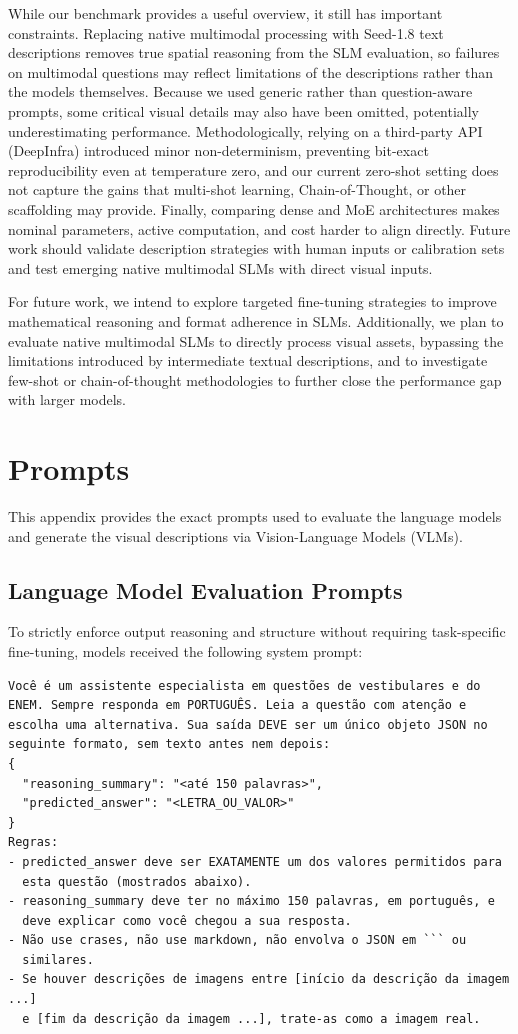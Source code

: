 \documentclass[12pt]{article}
\begin{document}
While our benchmark provides a useful overview, it still has important constraints. Replacing native multimodal processing with Seed-1.8 text descriptions removes true spatial reasoning from the SLM evaluation, so failures on multimodal questions may reflect limitations of the descriptions rather than the models themselves. Because we used generic rather than question-aware prompts, some critical visual details may also have been omitted, potentially underestimating performance. Methodologically, relying on a third-party API (DeepInfra) introduced minor non-determinism, preventing bit-exact reproducibility even at temperature zero, and our current zero-shot setting does not capture the gains that multi-shot learning, Chain-of-Thought, or other scaffolding may provide. Finally, comparing dense and MoE architectures makes nominal parameters, active computation, and cost harder to align directly. Future work should validate description strategies with human inputs or calibration sets and test emerging native multimodal SLMs with direct visual inputs.

For future work, we intend to explore targeted fine-tuning strategies to improve mathematical reasoning and format adherence in SLMs. Additionally, we plan to evaluate native multimodal SLMs to directly process visual assets, bypassing the limitations introduced by intermediate textual descriptions, and to investigate few-shot or chain-of-thought methodologies to further close the performance gap with larger models.

\appendix
\section{Prompts}
\label{sec:prompts}

This appendix provides the exact prompts used to evaluate the language models and generate the visual descriptions via Vision-Language Models (VLMs).

\subsection*{Language Model Evaluation Prompts}
To strictly enforce output reasoning and structure without requiring task-specific fine-tuning, models received the following system prompt:

\begin{verbatim}
Você é um assistente especialista em questões de vestibulares e do 
ENEM. Sempre responda em PORTUGUÊS. Leia a questão com atenção e 
escolha uma alternativa. Sua saída DEVE ser um único objeto JSON no 
seguinte formato, sem texto antes nem depois:
{
  "reasoning_summary": "<até 150 palavras>",
  "predicted_answer": "<LETRA_OU_VALOR>"
}
Regras:
- predicted_answer deve ser EXATAMENTE um dos valores permitidos para 
  esta questão (mostrados abaixo).
- reasoning_summary deve ter no máximo 150 palavras, em português, e
  deve explicar como você chegou a sua resposta.
- Não use crases, não use markdown, não envolva o JSON em ``` ou
  similares.
- Se houver descrições de imagens entre [início da descrição da imagem ...]
  e [fim da descrição da imagem ...], trate-as como a imagem real.
\end{verbatim}
\end{document}
